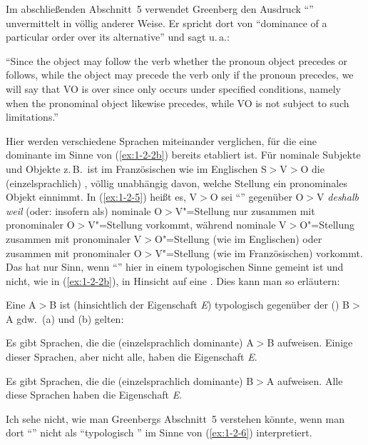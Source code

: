 \documentclass[output=paper]{langsci/langscibook}
\begin{document}
\ssubsection{}%
\label{subsec:1-2.2}
Im abschließenden Abschnitt~5 verwendet Greenberg den Ausdruck "`"' unvermittelt in völlig anderer Weise. Er spricht dort von "`dominance of a particular order over its alternative"' und sagt u.\,a.:
\begin{exe}
\ex\label{ex:1-2-5}
"`Since the  object may follow the verb whether the pronoun object
precedes or follows, while the  object may precede the verb only if
the pronoun precedes, we will say that VO is  over  since 
only occurs under specified conditions, namely when the pronominal object
likewise precedes, while VO is not subject to such limitations."' \citep[97]{Greenberg1963}
\end{exe}
Hier werden verschiedene Sprachen miteinander verglichen, für die eine dominante
 im Sinne von (\ref{ex:1-2-2b}) bereits etabliert ist. Für nominale Subjekte und Objekte z.\,B.\ ist im Französischen wie im Englischen S$>$V$>$O die (einzelsprachlich) , völlig unabhängig davon, welche Stellung ein pronominales Objekt einnimmt. In (\ref{ex:1-2-5}) heißt es, V$>$O sei "`"' gegenüber O$>$V \textit{deshalb weil} (oder: insofern als) nominale O$>$V"=Stellung nur zusammen mit pronominaler O$>$V"=Stellung
vorkommt, während nominale V$>$O"=Stellung zusammen mit pronominaler V$>$O"=Stellung (wie im Englischen) oder zusammen mit pronominaler O$>$V"=Stellung (wie
im Französischen) vorkommt. Das hat nur Sinn, wenn "`"' hier in einem typologischen Sinne gemeint ist und nicht, wie in (\ref{ex:1-2-2b}), in Hinsicht auf eine . Dies kann man so erläutern:
\begin{exe}
\ex\label{ex:1-2-6}
Eine  A$>$B ist (hinsichtlich der Eigenschaft \emph{E}) typologisch  gegenüber der ()  B$>$A gdw.\ (a) und (b)
gelten:
\begin{xlist}
\ex\label{ex:1-2-6a} 
\begin{xlist}
\ex\label{ex:1-2-6ai} Es gibt Sprachen, die die (einzelsprachlich dominante) 
A$>$B aufweisen.
\ex\label{ex:1-2-6aii} Einige dieser Sprachen, aber nicht alle, haben die Eigenschaft \emph{E}.
\end{xlist}
\ex\label{ex:1-2-6b} 
\begin{xlist}
\ex\label{ex:1-2-6bi} Es gibt Sprachen, die die (einzelsprachlich dominante) 
B$>$A aufweisen.
\ex\label{ex:1-2-6bii} Alle diese Sprachen haben die Eigenschaft \emph{E}.
\end{xlist}
\end{xlist}
\end{exe}
Ich sehe nicht, wie man Greenbergs Abschnitt~5 verstehen könnte, wenn man dort
"`"' nicht als "`typologisch "' im Sinne von (\ref{ex:1-2-6}) interpretiert.
\end{document}
